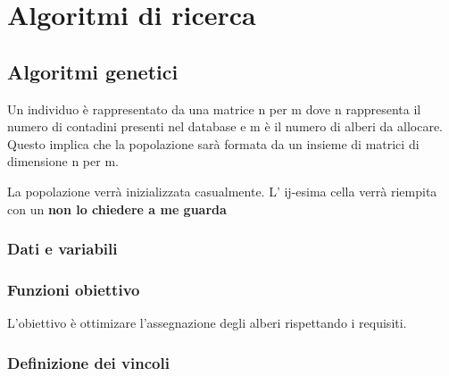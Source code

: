 \chapter{Algoritmi di ricerca} \label{T1}


\section{Algoritmi genetici}

Un individuo è rappresentato da una matrice  n per m dove n rappresenta il numero di contadini presenti nel database e m  è il numero di alberi da allocare. 
Questo implica che la popolazione sarà formata da un insieme di matrici di dimensione n per m.

La popolazione verrà inizializzata casualmente.  L' ij-esima cella verrà riempita con un \textbf{non lo chiedere a me guarda}

\subsection{Dati e variabili}

\subsection {Funzioni obiettivo}
L'obiettivo è ottimizare l'assegnazione degli alberi rispettando i requisiti. 

\subsection{Definizione dei vincoli}

